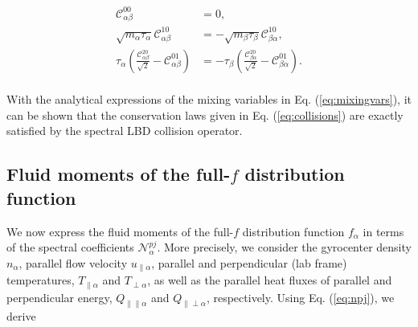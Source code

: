 \documentclass[preprint,12pt]{elsarticle}
\begin{document}
\begin{subequations} \label{eq:collisions}
  \begin{align}
    \mathcal{C}^{00}_{\alpha \beta} & = 0, \\
    \sqrt{m_\alpha \tau_\alpha}  \mathcal{C}^{10}_{\alpha \beta} & = -   \sqrt{m_\beta \tau_\beta}  \mathcal{C}^{10}_{\beta \alpha}, \\
\tau_\alpha \left(\frac{\mathcal{C}_{\alpha \beta}^{20}}{\sqrt{2}} - \mathcal{C}_{\alpha \beta}^{01}  \right)  & = - \tau_\beta \left( \frac{\mathcal{C}_{\beta \alpha}^{20}}{\sqrt{2}} - \mathcal{C}_{\beta \alpha}^{01} \right) . \label{eq:collenergyconservation}
  \end{align}
\end{subequations}
\\
With the analytical expressions of the mixing variables in Eq. (\ref{eq:mixingvars}), it can be shown that the conservation laws given in Eq. (\ref{eq:collisions}) are exactly satisfied by the spectral LBD collision operator.

\subsection{Fluid moments of the full-$f$ distribution function}
\label{subsec:momentsdistribution}

We now express the fluid moments of the full-$f$ distribution function $f_\alpha$ in terms of the spectral coefficients $\mathcal{N}_\alpha^{pj}$. More precisely, we consider the gyrocenter density $n_\alpha$, parallel flow velocity $u_{\parallel \alpha}$, parallel and perpendicular (lab frame) temperatures, $T_{\parallel \alpha}$ and $T_{\perp \alpha}$, as well as the parallel heat fluxes of parallel and perpendicular energy, $Q_{\parallel \parallel \alpha}$ and $Q_{\parallel \perp \alpha}$, respectively. Using Eq. (\ref{eq:npj}), we derive
\end{document}
